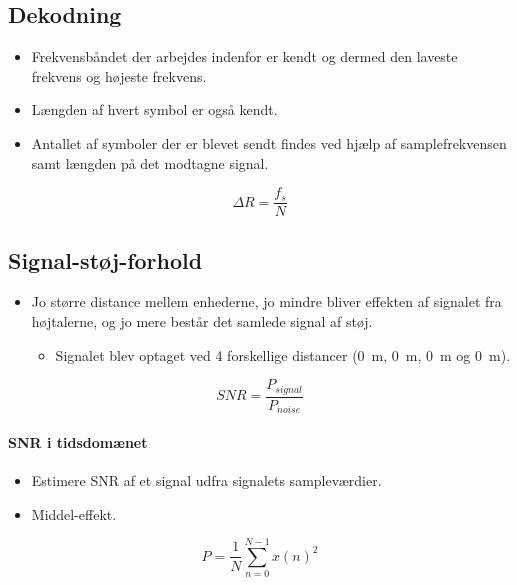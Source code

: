 \documentclass[danish]{article}
\begin{document}
\subsection{Dekodning}
\begin{itemize}
	\item Frekvensbåndet der arbejdes indenfor er kendt og dermed den laveste frekvens og højeste frekvens. 
	\item Længden af hvert symbol er også kendt.
	\item Antallet af symboler der er blevet sendt findes ved hjælp af samplefrekvensen samt længden på det modtagne signal.
\end{itemize}

\begin{equation}
\Delta R = \frac{f_s}{N}
\end{equation}

\subsection{Signal-støj-forhold}
\begin{itemize}
	\item Jo større distance mellem enhederne, jo mindre bliver effekten af signalet fra højtalerne, og jo mere består det samlede signal af støj.
	\begin{itemize}
		\item Signalet blev optaget ved 4 forskellige distancer (\SI{0}{\meter}, \SI{0}{\meter}, \SI{0}{\meter} og \SI{0}{\meter}).
	\end{itemize}
\end{itemize}

\begin{equation}
SNR = \frac{P_{signal}}{P_{noise}}
\end{equation}

\paragraph{SNR i tidsdomænet}
\begin{itemize}
	\item Estimere SNR af et signal udfra signalets sampleværdier. 
	\item Middel-effekt.
\end{itemize}

\begin{equation}
P = \frac{1}{N} \sum_{n=0}^{N-1}x(n)^2
\end{equation}
\end{document}
